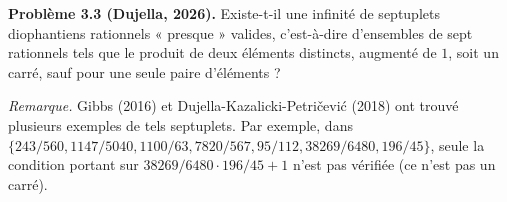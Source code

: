 \textbf{Problème 3.3 (Dujella, 2026).} Existe-t-il une infinité de septuplets diophantiens rationnels « presque » valides, c'est-à-dire d'ensembles de sept rationnels tels que le produit de deux éléments distincts, augmenté de $1$, soit un carré, sauf pour une seule paire d'éléments ?

\medskip

\textit{Remarque.} Gibbs (2016) et Dujella-Kazalicki-Petričević (2018) ont trouvé plusieurs exemples de tels septuplets. Par exemple, dans $\{243/560, 1147/5040, 1100/63, 7820/567, 95/112, 38269/6480, 196/45\}$, seule la condition portant sur $38269/6480 \cdot 196/45+1$ n'est pas vérifiée (ce n'est pas un carré).
